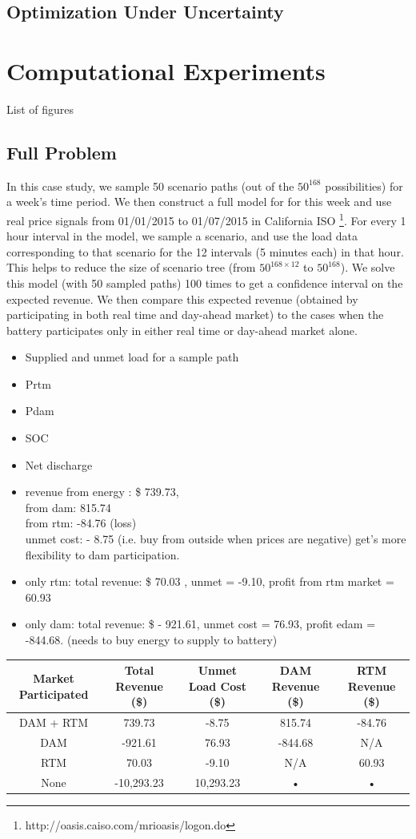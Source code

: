 \documentclass[11pt,twoside]{article}
\begin{document}
\subsection{Optimization Under Uncertainty}

\section{Computational Experiments}\label{sec:exp}
List of figures

\subsection{Full Problem}
In this case study, we sample 50 scenario paths (out of the $50^{168}$ possibilities) for a week's time period. We then construct a full model for for this week and use real price signals from 01/01/2015 to 01/07/2015 in California ISO \footnote{http://oasis.caiso.com/mrioasis/logon.do}. For every 1 hour interval in the model, we sample a scenario, and use the load data corresponding to that scenario for the 12 intervals (5 minutes each) in that hour. This helps to reduce the size of scenario tree (from $50^{168 \times 12}$ to $50^{168}$). We solve this model (with 50 sampled paths) 100 times to get a confidence interval on the expected revenue. We then compare this expected revenue (obtained by participating in both real time and day-ahead market) to the cases when the battery participates only in either real time or day-ahead market alone.
\begin{itemize}
\item Supplied and unmet load for a sample path
\item Prtm
\item Pdam
\item SOC 
\item Net discharge
\item revenue from energy : \$ 739.73, \\ from dam: 815.74 \\ from rtm:  -84.76 (loss) \\unmet cost: - 8.75   (i.e. buy from outside when prices are negative)
get's more flexibility to dam participation. 
\item only rtm: total revenue: \$ 70.03 , unmet = -9.10, profit from rtm market =  60.93
\item only dam: total revenue: \$ - 921.61, unmet cost = 76.93, profit edam = -844.68. (needs to buy energy to supply to battery) 
\end{itemize}
\begin{tabular}{|c|c|c|c|c|}
\hline 
Market Participated  & Total Revenue (\$) & Unmet Load Cost (\$) & DAM Revenue  (\$) & RTM Revenue (\$) \\ 
\hline 
DAM + RTM & 739.73 & -8.75 & 815.74 & -84.76 \\ 
\hline 
DAM & -921.61 & 76.93 & -844.68 & N/A \\ 
\hline 
RTM & 70.03 & -9.10 & N/A & 60.93 \\ 
\hline 
None & -10,293.23 & 10,293.23 & • & • \\ 
\hline 
\end{tabular} 
\end{document}
